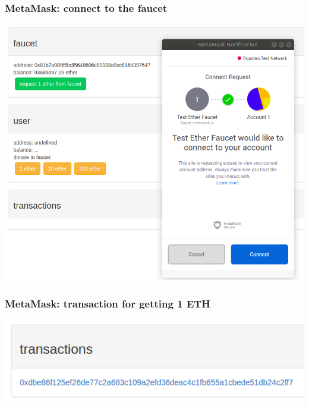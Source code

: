 \documentclass[11pt]{beamer}  %
\begin{document}
\begin{frame}\frametitle{MetaMask: connect to the faucet}

  \begin{center}
    \includegraphics[scale=0.3,clip=false]{pictures/metamask-faucet.png}
  \end{center}

\end{frame}

\begin{frame}\frametitle{MetaMask: transaction for getting 1 ETH}

  \begin{center}
    \includegraphics[width=\textwidth,clip=false]{pictures/metamask-faucet-transaction.png}
  \end{center}

\end{frame}
\end{document}
